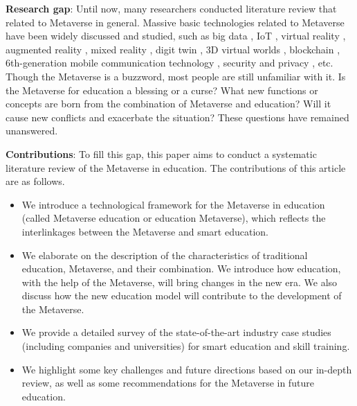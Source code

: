 \documentclass[conference]{IEEEtran}
\begin{document}
\textbf{Research gap}: Until now, many researchers conducted literature review \cite{ning2021survey,wang2022survey,gadekallu2022blockchain,yang2022fusing} that related to Metaverse in general. Massive basic technologies related to Metaverse have been widely discussed and studied, such as big data \cite{gan2017data,gan2019survey,gan2021survey}, IoT \cite{mozumder2022overview,hajjaji2021big}, virtual reality \cite{miller2020personal}, augmented reality \cite{zhan2020augmented}, mixed reality \cite{siyaev2021towards}, digit twin \cite{liu2021review}, 3D virtual worlds \cite{dionisio20133d}, blockchain \cite{jeon2022blockchain,zhang2020manufacturing,sharples2016blockchain}, 6th-generation mobile communication technology \cite{nguyen20226g}, security and privacy \cite{chen2022metaverse,gan2018privacy}, etc. Though the Metaverse is a buzzword, most people are still unfamiliar with it. Is the Metaverse for education a blessing or a curse? What new functions or concepts are born from the combination of Metaverse and education? Will it cause new conflicts and exacerbate the situation? These questions have remained unanswered.

\textbf{Contributions}: To fill this gap, this paper aims to conduct a systematic literature review of the Metaverse in education. The contributions of this article are as follows.

\begin{itemize}
    \item We introduce a technological framework for the Metaverse in education (called Metaverse education or education Metaverse), which reflects the interlinkages between the Metaverse and smart education.

    \item We elaborate on the description of the characteristics of traditional education, Metaverse, and their combination. We introduce how education, with the help of the Metaverse, will bring changes in the new era. We also discuss how the new education model will contribute to the development of the Metaverse.
    
    \item We provide a detailed survey of the state-of-the-art industry case studies (including companies and universities) for smart education and skill training.
    
    \item We highlight some key challenges and future directions based on our in-depth review, as well as some recommendations for the Metaverse in future education.
\end{itemize}
\end{document}
